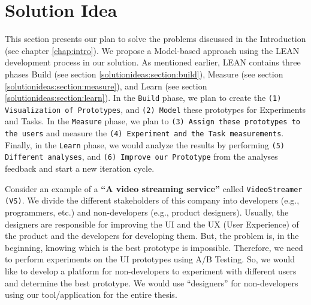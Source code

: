 \chapter{Solution Idea} \label{chap:solutionideas}

This section presents our plan to solve the problems discussed in the Introduction (see chapter \ref{chap:intro}).
We propose a Model-based approach using the LEAN development process in our solution.
As mentioned earlier, LEAN contains three phases Build (see section \ref{solutionideas:section:build}), Measure (see section \ref{solutionideas:section:measure}), and Learn (see section \ref{solutionideas:section:learn}).
In the \texttt{Build} phase, we plan to create the \texttt{(1) Visualization of Prototypes}, and \texttt{(2) Model} these prototypes for Experiments and Tasks.
In the \texttt{Measure} phase, we plan to \texttt{(3) Assign these prototypes to the users} and measure the \texttt{(4) Experiment and the Task measurements}.
Finally, in the \texttt{Learn} phase, we would analyze the results by performing \texttt{(5) Different analyses}, and \texttt{(6) Improve our Prototype} from the analyses feedback and start a new iteration cycle. 

Consider an example of a \textbf{``A video streaming service''} called \texttt{VideoStreamer (VS)}.
We divide the different stakeholders of this company into developers (e.g., programmers, etc.) and non-developers (e.g., product designers).
Usually, the designers are responsible for improving the UI and the UX (User Experience) of the product and the developers for developing them.
But, the problem is, in the beginning, knowing which is the best prototype is impossible.
Therefore, we need to perform experiments on the UI prototypes using A/B Testing.
So, we would like to develop a platform for non-developers to experiment with different users and determine the best prototype.
We would use ``designers'' for non-developers using our tool/application for the entire thesis.

